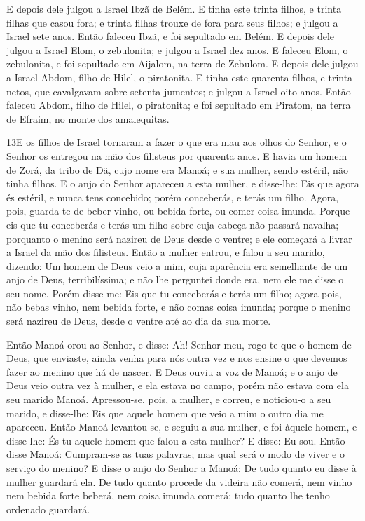 E depois dele julgou a Israel Ibzã de Belém. E tinha este
trinta filhos, e trinta filhas que casou fora; e trinta filhas
trouxe de fora para seus filhos; e julgou a Israel sete anos.
Então faleceu Ibzã, e foi sepultado em Belém. E depois
dele julgou a Israel Elom, o zebulonita; e julgou a Israel dez anos.
E faleceu Elom, o zebulonita, e foi sepultado em Aijalom, na
terra de Zebulom. E depois dele julgou a Israel Abdom, filho
de Hilel, o piratonita. E tinha este quarenta filhos, e
trinta netos, que cavalgavam sobre setenta jumentos; e julgou a
Israel oito anos. Então faleceu Abdom, filho de Hilel, o
piratonita; e foi sepultado em Piratom, na terra de Efraim, no monte
dos amalequitas.

\medskip

\lettrine{13} E os filhos de Israel tornaram a fazer o que era
mau aos olhos do Senhor, e o Senhor os entregou na mão dos filisteus
por quarenta anos. E havia um homem de Zorá, da tribo de Dã,
cujo nome era Manoá; e sua mulher, sendo estéril, não tinha filhos.
E o anjo do Senhor apareceu a esta mulher, e disse-lhe: Eis que
agora és estéril, e nunca tens concebido; porém conceberás, e terás
um filho. Agora, pois, guarda-te de beber vinho, ou bebida
forte, ou comer coisa imunda. Porque eis que tu conceberás e
terás um filho sobre cuja cabeça não passará navalha; porquanto o
menino será nazireu de Deus desde o ventre; e ele começará a livrar
a Israel da mão dos filisteus. Então a mulher entrou, e falou a
seu marido, dizendo: Um homem de Deus veio a mim, cuja aparência era
semelhante de um anjo de Deus, terribilíssima; e não lhe perguntei
donde era, nem ele me disse o seu nome. Porém disse-me: Eis que
tu conceberás e terás um filho; agora pois, não bebas vinho, nem
bebida forte, e não comas coisa imunda; porque o menino será nazireu
de Deus, desde o ventre até ao dia da sua morte.

Então Manoá orou ao Senhor, e disse: Ah! Senhor meu, rogo-te que o
homem de Deus, que enviaste, ainda venha para nós outra vez e nos
ensine o que devemos fazer ao menino que há de nascer. E Deus
ouviu a voz de Manoá; e o anjo de Deus veio outra vez à mulher, e
ela estava no campo, porém não estava com ela seu marido Manoá.
Apressou-se, pois, a mulher, e correu, e noticiou-o a seu
marido, e disse-lhe: Eis que aquele homem que veio a mim o outro dia
me apareceu. Então Manoá levantou-se, e seguiu a sua mulher,
e foi àquele homem, e disse-lhe: És tu aquele homem que falou a esta
mulher? E disse: Eu sou. Então disse Manoá: Cumpram-se as
tuas palavras; mas qual será o modo de viver e o serviço do menino?
E disse o anjo do Senhor a Manoá: De tudo quanto eu disse à
mulher guardará ela. De tudo quanto procede da videira não
comerá, nem vinho nem bebida forte beberá, nem coisa imunda comerá;
tudo quanto lhe tenho ordenado guardará.

